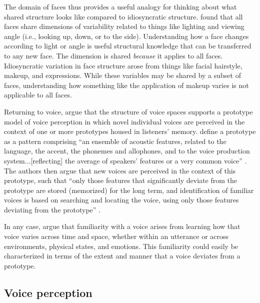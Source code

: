 The domain of faces thus provides a useful analogy for thinking about what shared structure looks like compared to idiosyncratic structure. \citet{burton_2016_faces} found that all faces share dimensions of variability related to things like lighting and viewing angle (i.e., looking up, down, or to the side). Understanding how a face changes according to light or angle is useful structural knowledge that can be transferred to any new face. The dimension is shared \textit{because} it applies to all faces. Idiosyncratic variation in face structure arose from things like facial hairstyle, makeup, and expressions. While these variables may be shared by a subset of faces, understanding how something like the application of makeup varies is not applicable to all faces. 

Returning to voice, \citet{lee_2019_acoustic} argue that the structure of voice spaces supports a prototype model of voice perception \citep{lavner_2001_prototype, latinus_2011_voice} in which novel individual voices are perceived in the context of one or more prototypes housed in listeners' memory. \citeauthor{lavner_2001_prototype} define a prototype as a pattern comprising ``an ensemble of acoustic features, related to the language, the accent, the phonemes and allophones, and to the voice production system...[reflecting] the average of speakers’ features or a very common voice'' \citeyearpar[][p. 64]{lavner_2001_prototype}. The authors then argue that new voices are perceived in the context of this prototype, such that ``only those features that significantly deviate from the prototype are stored (memorized) for the long term, and identification of familiar voices is based on searching and locating the voice, using only those features deviating from the prototype'' \citep[][p. 64]{lavner_2001_prototype}.

In any case, \citet{lee_2019_acoustic} argue that familiarity with a voice arises from learning how that voice varies across time and space, whether within an utterance or across environments, physical states, and emotions. This familiarity could easily be characterized in terms of the extent and manner that a voice deviates from a prototype. 

\subsection{Voice perception}\label{ch3:sec:voiceperception}


